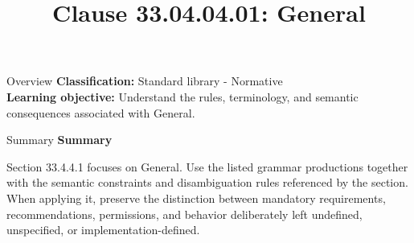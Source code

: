 \documentclass[10pt,letterpaper]{article}
\title{Clause 33.04.04.01: General}
\author{}
\date{}
\begin{document}
\maketitle
\begin{CornellOverviewBox}{Overview}
\textbf{Classification:} Standard library - Normative\\[2pt]
\textbf{Learning objective:} Understand the rules, terminology, and semantic consequences associated with General.
\end{CornellOverviewBox}\begin{CornellSummaryBox}{Summary}
{\sffamily\bfseries\color{Accent} Summary}\par\vspace{3pt}Section 33.4.4.1 focuses on General. Use the listed grammar productions together with the semantic constraints and disambiguation rules referenced by the section. When applying it, preserve the distinction between mandatory requirements, recommendations, permissions, and behavior deliberately left undefined, unspecified, or implementation-defined.
\end{CornellSummaryBox}
\end{document}
